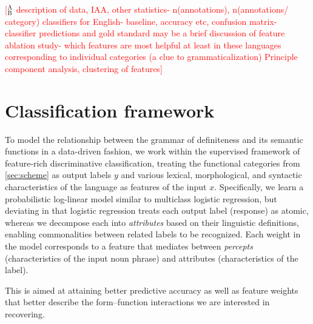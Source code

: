 \documentclass[11pt,letterpaper]{article}
\newcommand{\ensuretext}[1]{#1}
\newcommand{\nssmarker}{\ensuretext{\textcolor{magenta}{\ensuremath{^{\textsc{NS}}_{\textsc{S}}}}}}
\newcommand{\abmarker}{\ensuretext{\textcolor{red}{\ensuremath{^{\textsc{A}}_{\textsc{B}}}}}}
\newcommand{\arkcomment}[3]{\ensuretext{\textcolor{#3}{[#1 #2]}}}
\newcommand{\nss}[1]{\arkcomment{\nssmarker}{#1}{magenta}}
\newcommand{\ab}[1]{\arkcomment{\abmarker}{#1}{red}}
\newcommand{\costversion}[1]{}
\begin{document}
\ab{description of data, IAA, other statistics- n(annotations), n(annotations/ category)
classifiers for English- baseline, accuracy etc, confusion matrix- classifier predictions and gold standard
may be a brief discussion of feature ablation study-  which features are most helpful at least in these languages corresponding to individual categories (a clue to grammaticalization)
Principle component analysis, clustering of features}

\section{Classification framework}\label{sec:modeling}

To model the relationship between the grammar of definiteness and its semantic functions in a data-driven fashion,
we work within the supervised framework of feature-rich discriminative classification, 
treating the functional categories from \cref{sec:scheme} as output labels $y$
and various lexical, morphological, and syntactic characteristics of the language as features of the input $x$.
Specifically, we learn a probabilistic log-linear model similar to multiclass logistic regression, 
but deviating in that
logistic regression treats each output label (response) as atomic, whereas 
we decompose each into \emph{attributes} based on their linguistic definitions, 
enabling commonalities between related labels to be recognized.
Each weight in the model corresponds to a feature that mediates between 
\emph{percepts} (characteristics of the input noun phrase) and attributes (characteristics of the label).
\costversion{\nss{}the following ways:
\begin{itemize}
  \item Logistic regression treats each output label (response) as atomic; 
  we decompose each into \emph{attributes} based on their linguistic definitions, 
  enabling commonalities between related labels to be recognized.
  Each weight in the model corresponds to a feature that mediates between 
  \emph{percepts} (characteristics of the input noun phrase) and attributes (characteristics of the label).
  \item Logistic regression assumes a prediction is either correct or incorrect.
  We incorporate a \emph{cost function} that gives partial credit during learning when a related label 
  is predicted, so the learned model will better match our evaluation measure.
  \item Logistic regression assumes the space of possible predictions matches 
  the space of labels observed in the training data; we allow more abstract labels to be predicted, 
  which can receive partial credit. The scoring scheme encourages the predictor to ``back off'' 
  to a coarser label if it is not sufficiently confident about a fine-grained label.
\end{itemize}
These decisions are\nss{}}
This is aimed at attaining better predictive accuracy 
as well as feature weights that better describe the form--function interactions we are interested in recovering.
\end{document}
